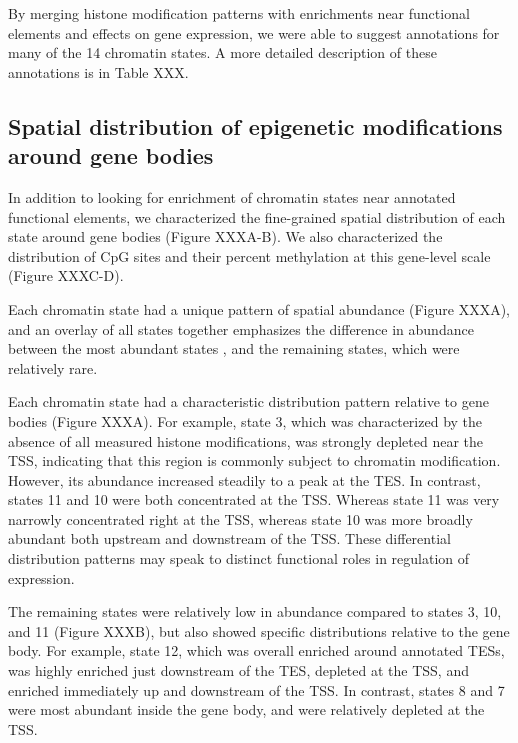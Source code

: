 \documentclass[10pt,letterpaper]{article}
\begin{document}
By merging histone modification patterns with enrichments near
functional elements and effects on gene expression, we were able to
suggest annotations for many of the 14 chromatin states. A more detailed
description of these annotations is in Table XXX.

\hypertarget{spatial-distribution-of-epigenetic-modifications-around-gene-bodies}{%
\subsection{Spatial distribution of epigenetic modifications around gene
bodies}\label{spatial-distribution-of-epigenetic-modifications-around-gene-bodies}}

In addition to looking for enrichment of chromatin states near annotated
functional elements, we characterized the fine-grained spatial
distribution of each state around gene bodies (Figure XXXA-B). We also
characterized the distribution of CpG sites and their percent
methylation at this gene-level scale (Figure XXXC-D).

Each chromatin state had a unique pattern of spatial abundance (Figure
XXXA), and an overlay of all states together emphasizes the difference
in abundance between the most abundant states , and the remaining
states, which were relatively rare.

Each chromatin state had a characteristic distribution pattern relative
to gene bodies (Figure XXXA). For example, state 3, which was
characterized by the absence of all measured histone modifications, was
strongly depleted near the TSS, indicating that this region is commonly
subject to chromatin modification. However, its abundance increased
steadily to a peak at the TES. In contrast, states 11 and 10 were both
concentrated at the TSS. Whereas state 11 was very narrowly concentrated
right at the TSS, whereas state 10 was more broadly abundant both
upstream and downstream of the TSS. These differential distribution
patterns may speak to distinct functional roles in regulation of
expression.

The remaining states were relatively low in abundance compared to states
3, 10, and 11 (Figure XXXB), but also showed specific distributions
relative to the gene body. For example, state 12, which was overall
enriched around annotated TESs, was highly enriched just downstream of
the TES, depleted at the TSS, and enriched immediately up and downstream
of the TSS. In contrast, states 8 and 7 were most abundant inside the
gene body, and were relatively depleted at the TSS.
\end{document}
